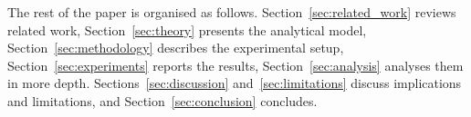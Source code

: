 The rest of the paper is organised as follows. Section~\ref{sec:related_work} reviews related work, Section~\ref{sec:theory} presents the analytical model, Section~\ref{sec:methodology} describes the experimental setup, Section~\ref{sec:experiments} reports the results, Section~\ref{sec:analysis} analyses them in more depth. Sections~\ref{sec:discussion} and~\ref{sec:limitations} discuss implications and limitations, and Section~\ref{sec:conclusion} concludes.
